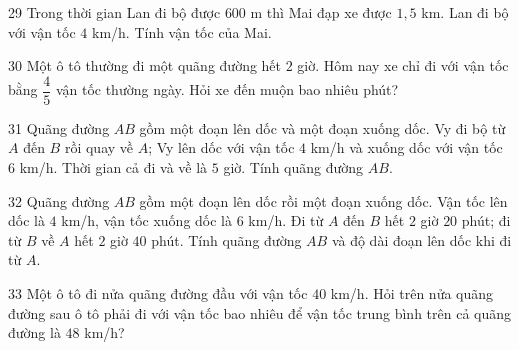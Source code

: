 \gap
\begin{probbox}{29}{\relax}
Trong thời gian Lan đi bộ được $600$ m thì Mai đạp xe được $1{,}5$ km. Lan đi bộ với vận tốc $4$ km/h. Tính vận tốc của Mai.
\end{probbox}
\gap
\begin{probbox}{30}{\relax}
Một ô tô thường đi một quãng đường hết $2$ giờ. Hôm nay xe chỉ đi với vận tốc bằng $\dfrac45$ vận tốc thường ngày. Hỏi xe đến muộn bao nhiêu phút?
\end{probbox}
\begin{probbox}{31}{}
Quãng đường $AB$ gồm một đoạn lên dốc và một đoạn xuống dốc. Vy đi bộ từ $A$ đến $B$ rồi quay về $A$; Vy lên dốc với vận tốc $4$ km/h và xuống dốc với vận tốc $6$ km/h. Thời gian cả đi và về là $5$ giờ. Tính quãng đường $AB$.
\end{probbox}
\gap
\begin{probbox}{32}{}
Quãng đường $AB$ gồm một đoạn lên dốc rồi một đoạn xuống dốc. Vận tốc lên dốc là $4$ km/h, vận tốc xuống dốc là $6$ km/h. Đi từ $A$ đến $B$ hết $2$ giờ $20$ phút; đi từ $B$ về $A$ hết $2$ giờ $40$ phút. Tính quãng đường $AB$ và độ dài đoạn lên dốc khi đi từ $A$.
\end{probbox}
\gap
\begin{probbox}{33}{}
Một ô tô đi nửa quãng đường đầu với vận tốc $40$ km/h. Hỏi trên nửa quãng đường sau ô tô phải đi với vận tốc bao nhiêu để vận tốc trung bình trên cả quãng đường là $48$ km/h?
\end{probbox}
